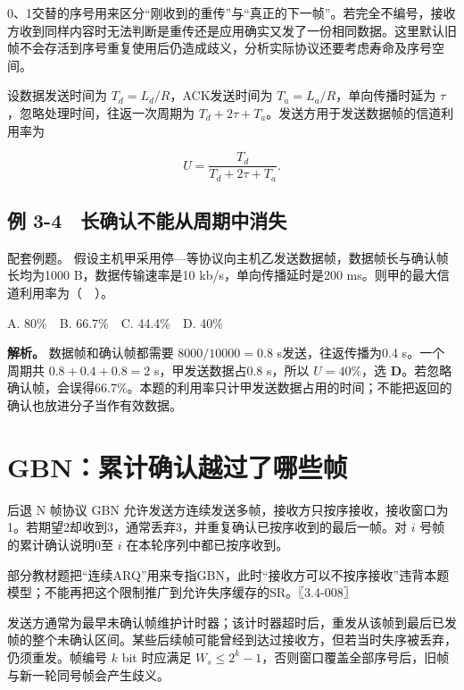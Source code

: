 0、1交替的序号用来区分``刚收到的重传''与``真正的下一帧''。若完全不编号，接收方收到同样内容时无法判断是重传还是应用确实又发了一份相同数据。这里默认旧帧不会存活到序号重复使用后仍造成歧义，分析实际协议还要考虑寿命及序号空间。

设数据发送时间为 \(T_d=L_d/R\)，ACK发送时间为 \(T_a=L_a/R\)，单向传播时延为 \(\tau\)，忽略处理时间，往返一次周期为 \(T_d+2\tau+T_a\)。发送方用于发送数据帧的信道利用率为

\[U=\frac{T_d}{T_d+2\tau+T_a}.\]

\subsection{例 3-4　长确认不能从周期中消失}\label{CN03-ex4}

{\begin{example}[配套例题]

配套例题。 假设主机甲采用停---等协议向主机乙发送数据帧，数据帧长与确认帧长均为1000 B，数据传输速率是10 kb/s，单向传播延时是200 ms。则甲的最大信道利用率为（　）。

A. 80\%　B. 66.7\%　C. 44.4\%　D. 40\%

\end{example}}

\textbf{解析。} 数据帧和确认帧都需要 \(8000/10000=0.8\) s发送，往返传播为0.4 s。一个周期共 \(0.8+0.4+0.8=2\) s，甲发送数据占0.8 s，所以 \(U=40\%\)，选 \textbf{D}。若忽略确认帧，会误得66.7\%。本题的利用率只计甲发送数据占用的时间；不能把返回的确认也放进分子当作有效数据。

\section{GBN：累计确认越过了哪些帧}\label{CN03-07}

后退 N 帧协议 GBN 允许发送方连续发送多帧，接收方只按序接收，接收窗口为1。若期望2却收到3，通常丢弃3，并重复确认已按序收到的最后一帧。对 \(i\) 号帧的累计确认说明0至 \(i\) 在本轮序列中都已按序收到。

部分教材题把``连续ARQ''用来专指GBN，此时``接收方可以不按序接收''违背本题模型；不能再把这个限制推广到允许失序缓存的SR。〖3.4-008〗

发送方通常为最早未确认帧维护计时器；该计时器超时后，重发从该帧到最后已发帧的整个未确认区间。某些后续帧可能曾经到达过接收方，但若当时失序被丢弃，仍须重发。帧编号 \(k\) bit 时应满足 \(W_s\le2^k-1\)，否则窗口覆盖全部序号后，旧帧与新一轮同号帧会产生歧义。

